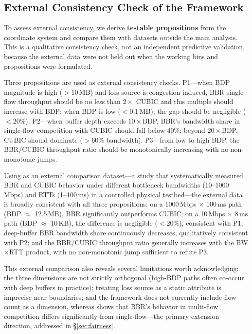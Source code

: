 \documentclass[a4paper,fleqn]{cas-sc}
\begin{document}
\subsection{External Consistency Check of the Framework}
\label{sec:framework_valid}

To assess external consistency, we derive \textbf{testable propositions} from
the coordinate system and compare them with datasets outside the main analysis.
This is a qualitative consistency check, not an independent predictive
validation, because the external data were not held out when the working bins
and propositions were formulated.

Three propositions are used as external consistency checks. P1---when BDP magnitude is high ($>10$\,MB) and loss source
is congestion-induced, BBR single-flow throughput should be no less than $2\times$
CUBIC and this multiple should increase with BDP; when BDP is low ($<0.1$\,MB),
the gap should be negligible ($<20\%$). P2---when buffer depth exceeds
$10\times$BDP, BBR's bandwidth share in single-flow competition with CUBIC should
fall below 40\%; beyond $20\times$BDP, CUBIC should dominate ($>60\%$ bandwidth).
P3---from low to high BDP, the BBR/CUBIC throughput ratio should be
monotonically increasing with no non-monotonic jumps.

Using \citet{scholz2018deeper} as an external comparison dataset---a study
that systematically measured BBR and CUBIC behavior under different bottleneck
bandwidths (10--1000\,Mbps) and RTTs (1--100\,ms) in a controlled physical
testbed---the external data is broadly consistent with all three propositions: on
a 1000\,Mbps $\times$ 100\,ms path (BDP $\approx$ 12.5\,MB), BBR significantly
outperforms CUBIC; on a 10\,Mbps $\times$ 8\,ms path (BDP $\approx$ 10\,KB),
the difference is negligible ($<20\%$), consistent with P1; deep-buffer BBR
bandwidth share continuously decreases, qualitatively consistent with P2; and the
BBR/CUBIC throughput ratio generally increases with the BW$\times$RTT product,
with no non-monotonic jump sufficient to refute P3.

This external comparison also reveals several limitations worth acknowledging: the
three dimensions are not strictly orthogonal (high-BDP paths often co-occur with
deep buffers in practice); treating loss source as a static attribute is imprecise
near boundaries; and the framework does not currently include flow count as a
dimension, whereas \citet{scholz2018deeper} shows that BBR's behavior in
multi-flow competition differs significantly from single-flow---the primary
extension direction, addressed in \S\ref{sec:fairness}.
\end{document}
